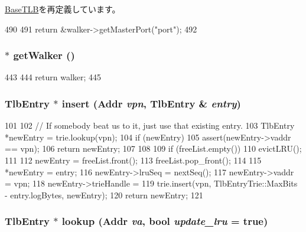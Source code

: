 \hyperlink{classBaseTLB_a5125451589673cb85c7cab06c2ac5434}{BaseTLB}を再定義しています。


\begin{DoxyCode}
490 {
491     return &walker->getMasterPort("port");
492 }
\end{DoxyCode}
\hypertarget{classX86ISA_1_1TLB_a2f35a7f4b93d6ec096a0785e0d7113cd}{
\subsubsection[{getWalker}]{ $\ast$ getWalker ()}}
\label{classX86ISA_1_1TLB_a2f35a7f4b93d6ec096a0785e0d7113cd}



\begin{DoxyCode}
443 {
444     return walker;
445 }
\end{DoxyCode}
\hypertarget{classX86ISA_1_1TLB_a1b0164809bc96e78b231ff2143eb3cfc}{
\subsubsection[{insert}]{\setlength{\rightskip}{0pt plus 5cm}TlbEntry $\ast$ insert ({\bf Addr} {\em vpn}, \/  TlbEntry \& {\em entry})}}
\label{classX86ISA_1_1TLB_a1b0164809bc96e78b231ff2143eb3cfc}



\begin{DoxyCode}
101 {
102     // If somebody beat us to it, just use that existing entry.
103     TlbEntry *newEntry = trie.lookup(vpn);
104     if (newEntry) {
105         assert(newEntry->vaddr == vpn);
106         return newEntry;
107     }
108 
109     if (freeList.empty())
110         evictLRU();
111 
112     newEntry = freeList.front();
113     freeList.pop_front();
114 
115     *newEntry = entry;
116     newEntry->lruSeq = nextSeq();
117     newEntry->vaddr = vpn;
118     newEntry->trieHandle =
119     trie.insert(vpn, TlbEntryTrie::MaxBits - entry.logBytes, newEntry);
120     return newEntry;
121 }
\end{DoxyCode}
\hypertarget{classX86ISA_1_1TLB_ab71ae01bf6743de678ebdc212e7bb401}{
\subsubsection[{lookup}]{\setlength{\rightskip}{0pt plus 5cm}TlbEntry $\ast$ lookup ({\bf Addr} {\em va}, \/  bool {\em update\_\-lru} = {\ttfamily true})}}
\label{classX86ISA_1_1TLB_ab71ae01bf6743de678ebdc212e7bb401}



